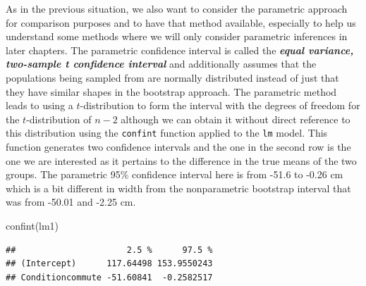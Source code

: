 \documentclass[
]{book}
\newenvironment{Shaded}{\begin{snugshade}}{\end{snugshade}}
\newcommand{\FunctionTok}[1]{\textcolor[rgb]{0.00,0.00,0.00}{#1}}
\newcommand{\NormalTok}[1]{#1}
\begin{document}
\indent As in the previous situation, we also want to consider the parametric
approach
for comparison purposes and to have that method available, especially to help
us understand some methods where we will only consider parametric inferences
in later chapters. The parametric confidence interval is called the
\textbf{\emph{equal variance, two-sample t confidence interval}} and additionally
assumes that the populations
being sampled from are normally distributed instead of just that they have similar shapes in the bootstrap approach. The parametric method leads to using a \(t\)-distribution
to form the interval with the degrees of freedom for the \(t\)-distribution of \(n-2\) although we can obtain it without direct reference to this distribution using the \texttt{confint} function applied to the \texttt{lm} model. This function generates two confidence intervals and the one in the second row is the one we are interested as it pertains to the difference in the true means of the two groups. The parametric 95\% confidence interval here is from -51.6 to -0.26 cm which is a bit different in width from the nonparametric bootstrap interval that was from -50.01 and -2.25 cm.

\begin{Shaded}
\begin{Highlighting}[]
\FunctionTok{confint}\NormalTok{(lm1)}
\end{Highlighting}
\end{Shaded}

\begin{verbatim}
##                      2.5 %      97.5 %
## (Intercept)      117.64498 153.9550243
## Conditioncommute -51.60841  -0.2582517
\end{verbatim}
\end{document}
